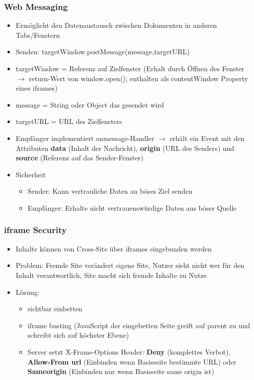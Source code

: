 \documentclass{article} %
\begin{document}
	\subsubsection{Web Messaging}
	\begin{itemize}
		\item Ermöglicht den Datenaustausch zwischen Dokumenten in anderen Tabs/Fenstern
		\item Senden: targetWindow.postMessage(message,targetURL)
		\item targetWindow = Referenz auf Zielfenster (Erhalt durch Öffnen des Fenster $\rightarrow$ return-Wert von window.open(); enthalten als contentWindow Property eines iframes)
		\item message = String oder Object das gesendet wird
		\item targetURL = URL des Zielfensters
		\item Empfänger implementiert onmessage-Handler $\rightarrow$ erhält ein Event mit den Attributen \textbf{data} (Inhalt der Nachricht), \textbf{origin} (URL des Senders) und \textbf{source} (Referenz auf das Sender-Fenster)
		\item Sicherheit
		\begin{itemize}
			\item Sender: Kann vertrauliche Daten an böses Ziel senden 
			\item Empfänger: Erhalte nicht vertrauenswürdige Daten aus böser Quelle
		\end{itemize}
	\end{itemize}
	\subsubsection{iframe Security}
	\begin{itemize}
		\item Inhalte können von Cross-Site über iframes eingebunden werden
		\item Problem: Fremde Site verändert eigene Site, Nutzer sieht nicht wer für den Inhalt verantwortlich, Site macht sich fremde Inhalte zu Nutze
		\item Lösung:
		\begin{itemize}
			\item sichtbar einbetten
			\item iframe busting (JavaScript der eingebetten Seite greift auf parent zu und schreibt sich auf höchster Ebene)
			\item Server setzt X-Frame-Options Header: \textbf{Deny }(komplettes Verbot), \textbf{Allow-From url} (Einbinden wenn Basisseite bestimmte URL) oder \textbf{Sameorigin} (Einbinden nur wenn Basisseite same origin ist)
		\end{itemize}
	\end{itemize}
\end{document}
